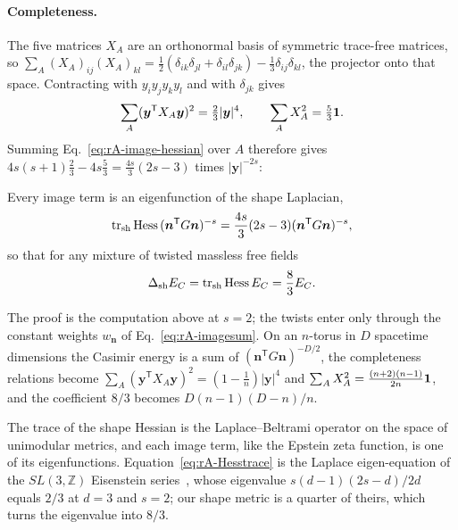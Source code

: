 \paragraph{Completeness.}
The five matrices $X_A$ are an orthonormal basis of symmetric trace-free matrices, so $\sum_A(X_A)_{ij}(X_A)_{kl}=\tfrac12(\delta_{ik}\delta_{jl}+\delta_{il}\delta_{jk})-\tfrac13\delta_{ij}\delta_{kl}$, the projector onto that space.
Contracting with $y_iy_jy_ky_l$ and with $\delta_{jk}$ gives
\begin{equation}
\sum_A(\bm y^{\mathsf T}X_A\bm y)^2=\tfrac23|\bm y|^4,\qquad \sum_AX_A^2=\tfrac53\mathbf{1} .
\label{eq:rA-completeness}
\end{equation}
Summing Eq.~\eqref{eq:rA-image-hessian} over $A$ therefore gives $4s(s+1)\tfrac23-4s\tfrac53=\tfrac{4s}3(2s-3)$ times $|\bm y|^{-2s}$:

\begin{rAtheorem}\label{thm:rA-laplacian}
Every image term is an eigenfunction of the shape Laplacian,
\begin{equation}
\operatorname{tr}_{\mathrm{sh}}{\rm Hess}\,(\bm n^{\mathsf T}G\bm n)^{-s}=\frac{4s}{3}(2s-3)(\bm n^{\mathsf T}G\bm n)^{-s},
\end{equation}
so that for any mixture of twisted massless free fields
\begin{equation}
\Delta_{\mathrm{sh}}E_C=\operatorname{tr}_{\mathrm{sh}}{\rm Hess}\,E_C=\frac83E_C .
\label{eq:rA-Hesstrace}
\end{equation}
\end{rAtheorem} %

The proof is the computation above at $s=2$; the twists enter only through the constant weights $w_{\bm n}$ of Eq.~\eqref{eq:rA-imagesum}.
On an $n$-torus in $D$ spacetime dimensions the Casimir energy is a sum of $(\bm n^{\mathsf T}G\bm n)^{-D/2}$, the completeness relations become $\sum_A(\bm y^{\mathsf T}X_A\bm y)^2=(1-\tfrac1n)|\bm y|^4$ and $\sum_AX_A^2=\tfrac{(n+2)(n-1)}{2n}\mathbf{1}$, and the coefficient $8/3$ becomes $D(n-1)(D-n)/n$.

The trace of the shape Hessian is the Laplace--Beltrami operator on the space of unimodular metrics, and each image term, like the Epstein zeta function, is one of its eigenfunctions.
Equation~\eqref{eq:rA-Hesstrace} is the Laplace eigen-equation of the $SL(3,\mathbb Z)$ Eisenstein series~\cite{Obers:1999um}, whose eigenvalue $s(d-1)(2s-d)/2d$ equals $2/3$ at $d=3$ and $s=2$; our shape metric is a quarter of theirs, which turns the eigenvalue into $8/3$. %

